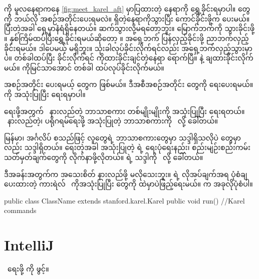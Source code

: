 \begin{sloppypar}
\section{ \mmprogram}
\enbeeper ကို မူလနေရာကနေ \Fig \vref*{fig:meet_karel_aft} မှာပြထားတဲ့ နေရာကို ရွှေ့ခိုင်းရမှာပါ။ \mmcommand တွေကို ဘယ်လို အစဉ်အတိုင်းပေးရမလဲ။ \mmbeeper ရှိတဲ့နေရာကိုသွားပြီး \mmbeeper ကောင်ခိုင်းဖို့က  \mmcommand ပေးမယ်။ ပြီးတဲ့အခါ ရှေ့မှာနံရံရှိနေတယ်။ ဆက်သွားလို့မရတော့ဘူး။ မြောက်ဘက်ကို သွားခိုင်းဖို့ ။ နှစ်ကြိမ်ထပ်ပြီးရွှေ့ခိုင်းရမယ်ဆိုတော့ ။ အရှေ့ဘက် ပြန်လှည့်ခိုင်းဖို့ ညာဘက်လှည့်ခိုင်းရမယ်။ ဒါပေမယ့်  \mmcommand မရှိဘူး။  သုံးခါလုပ်ခိုင်းလိုက်ရင်လည်း အရှေ့ဘက်လှည့်သွားမှာပဲ။ တစ်ခါထပ်ပြီး  ခိုင်းလိုက်ရင် \mmbeeper ကိုထားခိုင်းချင်တဲ့နေရာ ရောက်ပြီ။  နဲ့ \mmbeeper ချထားခိုင်းလိုက်မယ်။ \mmbeeper ကိုမြင်သာအောင်  တစ်ခါ ထပ်လုပ်ခိုင်းလိုက်မယ်။

အစဉ်အတိုင်း ပေးရမယ့် \mmcommand တွေက  ဖြစ်မယ်။ ဒီအစီအစဉ်အတိုင်း \mmcommand တွေကို \mmprogram ရေးပေးရမယ်။ \enJPL ကို အသုံးပြုပြီး ရေးရမှာပါ။ 

\mmprogram ရေးဖို့အတွက် \encomputer\ နားလည်တဲ့ ဘာသာစကား တစ်မျိုးမျိုးကို အသုံးပြုပြီး ရေးရတယ်။ \mmcomputer\ နားလည်တဲ့၊ \mmcomputer ပရိုဂရမ်ရေးဖို့ အသုံးပြုတဲ့ ဘာသာစကားကို \enPL\ လို့ ခေါ်တယ်။ 

မြန်မာ၊ အင်္ဂလိပ် စသည်ဖြင့် လူတွေရဲ့ ဘာသာစကားတွေမှာ သဒ္ဒါရှိသလိုပဲ \mmPL တွေမှာလည်း သဒ္ဒါရှိတယ်။ \mmprogram ရေးတဲ့အခါ အသုံးပြုတဲ့ \mmPL ရဲ့ ရေးပုံရေးနည်း၊ စည်းမျဉ်းစည်းကမ်း သတ်မှတ်ချက်တွေကို လိုက်နာဖို့လိုတယ်။ \mmPL ရဲ့ သဒ္ဒါကို \ensyntax\ လို့ ခေါ်တယ်။

ဒီအခန်းအတွက်က \mmsyntax အသေးစိတ် နားလည်ဖို့ မလိုသေးဘူး။ \enJPL ရဲ့ လိုအပ်ချက်အရ ပုံစံချပေးထားတဲ့ ကားရဲလ် \mmprogram\ \entemplate ကိုအသုံးပြုပြီး \mmcommand တွေကို \entemplate ထဲမှာပဲဖြည့်ရေးမယ်။ \entemplate က အခုလိုပုံစံပါ။

\begin{lstcodesimple}[float, caption=ကားရဲလ် ပရိုဂရမ် template]
public class ClassName extends stanford.karel.Karel{ 
        public void run(){
                //Karel commands
        }        
}
\end{lstcodesimple}




\section{IntelliJ}
\mmprogram\ ‌ရေးဖို့ \enintellij \enIDE ကို ဖွင့်။



\end{sloppypar}
